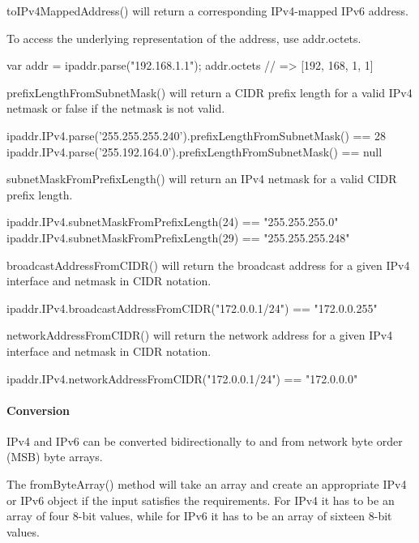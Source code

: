 {\ttfamily to\+I\+Pv4\+Mapped\+Address()} will return a corresponding I\+Pv4-\/mapped I\+Pv6 address.

To access the underlying representation of the address, use {\ttfamily addr.\+octets}.


\begin{DoxyCode}
var addr = ipaddr.parse("192.168.1.1");
addr.octets // => [192, 168, 1, 1]
\end{DoxyCode}


{\ttfamily prefix\+Length\+From\+Subnet\+Mask()} will return a C\+I\+DR prefix length for a valid I\+Pv4 netmask or false if the netmask is not valid.


\begin{DoxyCode}
ipaddr.IPv4.parse('255.255.255.240').prefixLengthFromSubnetMask() == 28
ipaddr.IPv4.parse('255.192.164.0').prefixLengthFromSubnetMask()  == null
\end{DoxyCode}


{\ttfamily subnet\+Mask\+From\+Prefix\+Length()} will return an I\+Pv4 netmask for a valid C\+I\+DR prefix length.


\begin{DoxyCode}
ipaddr.IPv4.subnetMaskFromPrefixLength(24) == "255.255.255.0"
ipaddr.IPv4.subnetMaskFromPrefixLength(29) == "255.255.255.248"
\end{DoxyCode}


{\ttfamily broadcast\+Address\+From\+C\+I\+D\+R()} will return the broadcast address for a given I\+Pv4 interface and netmask in C\+I\+DR notation. 
\begin{DoxyCode}
ipaddr.IPv4.broadcastAddressFromCIDR("172.0.0.1/24") == "172.0.0.255"
\end{DoxyCode}
 {\ttfamily network\+Address\+From\+C\+I\+D\+R()} will return the network address for a given I\+Pv4 interface and netmask in C\+I\+DR notation. 
\begin{DoxyCode}
ipaddr.IPv4.networkAddressFromCIDR("172.0.0.1/24") == "172.0.0.0"
\end{DoxyCode}


\paragraph*{Conversion}

I\+Pv4 and I\+Pv6 can be converted bidirectionally to and from network byte order (M\+SB) byte arrays.

The {\ttfamily from\+Byte\+Array()} method will take an array and create an appropriate I\+Pv4 or I\+Pv6 object if the input satisfies the requirements. For I\+Pv4 it has to be an array of four 8-\/bit values, while for I\+Pv6 it has to be an array of sixteen 8-\/bit values.

